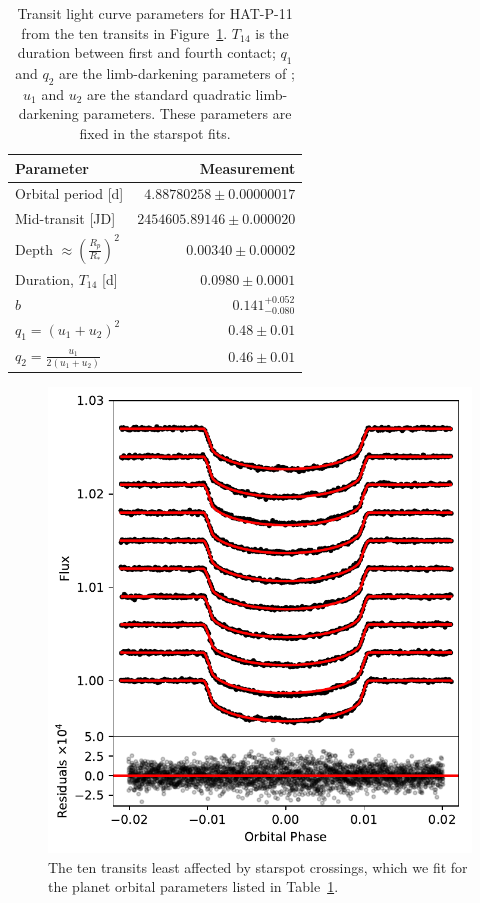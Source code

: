 \begin{table}
\begin{center}
\begin{tabular}{lr}
Parameter & Measurement\\ \hline \hline
Orbital period [d] & $4.88780258 \pm 0.00000017$ \\
Mid-transit [JD] & $2454605.89146 \pm 0.000020$ \\
Depth $\approx \left(\frac{R_p}{R_*}\right)^2$ & $0.00340 \pm 0.00002$\\
Duration, $T_{14}$ [d] & $0.0980 \pm 0.0001$\\
$b$ & $0.141^{+0.052}_{-0.080}$ \\
$q_1 = (u_1 + u_2)^2$ & $0.48 \pm 0.01$ \\ 
$q_2 = \frac{u_1 }{2(u_1 + u_2)}$ & $0.46 \pm 0.01$ 
\end{tabular}
\end{center}
\caption{Transit light curve parameters for HAT-P-11 from the ten transits in Figure~\ref{fig:spotlesstransits}. $T_{14}$ is the duration between first and fourth contact; $q_1$ and $q_2$ are the limb-darkening parameters of \citet{Kipping2013}; $u_1$ and $u_2$ are the standard quadratic limb-darkening parameters. These parameters are fixed in the starspot fits.}
\label{tab:transitprops}
\end{table}

\begin{figure}
\centering
\includegraphics[scale=1]{stsp_hat_p_11/hat11_spotless_transits_compact.pdf}
\caption{The ten transits least affected by starspot crossings, which we fit for the planet orbital parameters listed in Table~\ref{tab:transitprops}.}
\label{fig:spotlesstransits}
\end{figure}

